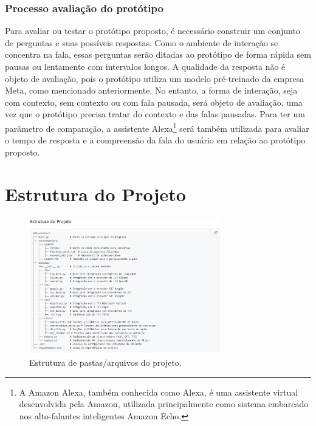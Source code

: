 \documentclass[10pt, conference, compsocconf]{IEEEtran}
\begin{document}
\subsubsection{Processo avaliação do protótipo}

Para avaliar ou testar o protótipo proposto, é necessário construir um conjunto de perguntas e suas possíveis respostas. Como o ambiente de interação se concentra na fala, essas perguntas serão ditadas ao protótipo de forma rápida sem pausas ou lentamente com intervalos longos. A qualidade da resposta não é objeto de avaliação, pois o protótipo utiliza um modelo pré-treinado da empresa Meta, como mencionado anteriormente. No entanto, a forma de interação, seja com contexto, sem contexto ou com fala pausada, será objeto de avaliação, uma vez que o protótipo precisa tratar do contexto e das falas pausadas. Para ter um parâmetro de comparação, a assistente Alexa\footnote{A Amazon Alexa, também conhecida como Alexa, é uma assistente virtual desenvolvida pela Amazon, utilizada principalmente como sistema embarcado nos alto-falantes inteligentes Amazon Echo.} será também utilizada para avaliar o tempo de resposta e a compreensão da fala do usuário em relação ao protótipo proposto.

\section{Estrutura do Projeto}

\FloatBarrier

\begin{figure}[!h]
\centering
\includegraphics[width=3.3in]{images/Estrutura do projeto.PNG}
\caption{Estrutura de pastas/arquivos do projeto.} 
\label{fig:estrutura}
\end{figure}

\FloatBarrier
\end{document}
